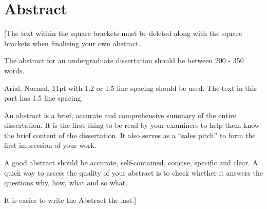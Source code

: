 \chapter*{Abstract}
[The text within the square brackets must be deleted along with the square brackets when finalising your own abstract. 

The abstract for an undergraduate dissertation should be between 200 - 350 words.

Arial, Normal, 11pt with 1.2 or 1.5 line spacing should be used. The text in this part has 1.5 line spacing.

An abstract is a brief, accurate and comprehensive summary of the entire dissertation. It is the first thing to be read by your examiners to help them know the brief content of the dissertation. It also serves as a “sales pitch” to form the first impression of your work. 

A good abstract should be accurate, self-contained, concise, specific and clear. A quick way to assess the quality of your abstract is to check whether it answers the questions why, how, what and so what.

It is easier to write the Abstract the last.]
